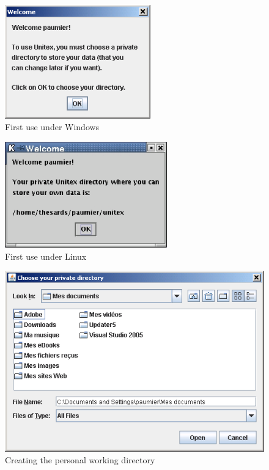 \begin{figure}[h]
\begin{center}
\includegraphics[width=6.3cm]{resources/img/fig1-1.png}
\caption{First use under Windows}
\end{center}
\end{figure}

\begin{figure}[h]
\begin{center}
\includegraphics[width=7cm]{resources/img/fig1-2.png}
\caption{First use under Linux}
\end{center}
\end{figure}

\begin{figure}[h]
\begin{center}
\includegraphics[width=13cm]{resources/img/fig1-3.png}
\caption{Creating the personal working
directory\label{fig-creation-personal-directory}}
\end{center}
\end{figure}



